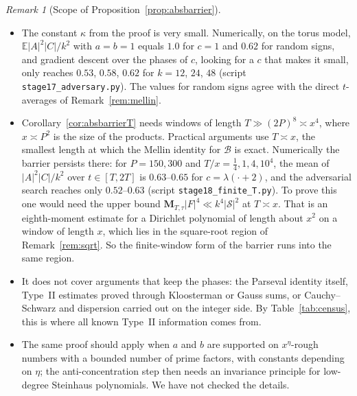 \documentclass[11pt]{amsart}
\theoremstyle{definition}
\theoremstyle{remark}
\newtheorem{remark}[theorem]{Remark}
\begin{document}
\begin{remark}[Scope of Proposition~\ref{prop:absbarrier}]\label{rem:absbarrier}
\leavevmode
\begin{itemize}
\item The constant $\kappa$ from the proof is very small. Numerically, on the torus model, $\mathbb E|A|^2|C|/k^2$ with $a=b=1$ equals $1.0$ for $c=1$ and $0.62$ for random signs, and gradient descent over the phases of $c$, looking for a $c$ that makes it small, only reaches $0.53$, $0.58$, $0.62$ for $k=12$, $24$, $48$ (script \texttt{stage17\_adversary.py}). The values for random signs agree with the direct $t$-averages of Remark~\ref{rem:mellin}.
\item Corollary~\ref{cor:absbarrierT} needs windows of length $T\gg(2P)^8\asymp x^4$, where $x\asymp P^2$ is the size of the products. Practical arguments use $T\asymp x$, the smallest length at which the Mellin identity for $\mathcal B$ is exact. Numerically the barrier persists there: for $P=150,300$ and $T/x=\frac14,1,4,10^4$, the mean of $|A|^2|C|/k^2$ over $t\in[T,2T]$ is $0.63$--$0.65$ for $c=\lambda(\cdot+2)$, and the adversarial search reaches only $0.52$--$0.63$ (script \texttt{stage18\_finite\_T.py}). To prove this one would need the upper bound $\mathbf M_{T,\tau}|F|^4\ll k^4|\mathcal S|^2$ at $T\asymp x$. That is an eighth-moment estimate for a Dirichlet polynomial of length about $x^2$ on a window of length $x$, which lies in the square-root region of Remark~\ref{rem:sqrt}. So the finite-window form of the barrier runs into the same region.
\item It does not cover arguments that keep the phases: the Parseval identity itself, Type~II estimates proved through Kloosterman or Gauss sums, or Cauchy--Schwarz and dispersion carried out on the integer side. By Table~\ref{tab:census}, this is where all known Type~II information comes from.
\item The same proof should apply when $a$ and $b$ are supported on $x^\eta$-rough numbers with a bounded number of prime factors, with constants depending on $\eta$; the anti-concentration step then needs an invariance principle for low-degree Steinhaus polynomials. We have not checked the details.
\end{itemize}
\end{remark}
\end{document}
